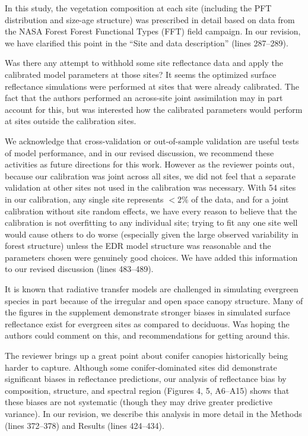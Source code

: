 In this study, the vegetation composition at each site (including the PFT distribution and size-age structure) was prescribed in detail based on data from the NASA Forest Forest Functional Types (FFT) field campaign.
In our revision, we have clarified this point in the ``Site and data description'' (lines 287--289).

\begin{reviewer}
  Was there any attempt to withhold some site reflectance data and apply the calibrated model parameters at those sites?
  It seems the optimized surface reflectance simulations were performed at sites that were already calibrated.
  The fact that the authors performed an across-site joint assimilation may in part account for this, but was interested how the calibrated parameters would perform at sites outside the calibration sites.
\end{reviewer}

We acknowledge that cross-validation or out-of-sample validation are useful tests of model performance, and in our revised discussion, we recommend these activities as future directions for this work.
However as the reviewer points out, because our calibration was joint across all sites, we did not feel that a separate validation at other sites not used in the calibration was necessary.
With 54 sites in our calibration, any single site represents $<2\%$ of the data, and for a joint calibration without site random effects, we have every reason to believe that the calibration is not overfitting to any individual site;
trying to fit any one site well would cause others to do worse (especially given the large observed variability in forest structure) unless the EDR model structure was reasonable and the parameters chosen were genuinely good choices.
We have added this information to our revised discussion (lines 483--489).

\begin{reviewer}
  It is known that radiative transfer models are challenged in simulating evergreen species in part because of the irregular and open space canopy structure.
  Many of the figures in the supplement demonstrate stronger biases in simulated surface reflectance exist for evergreen sites as compared to deciduous. Was hoping the authors could comment on this, and recommendations for getting around this.
\end{reviewer}

The reviewer brings up a great point about conifer canopies historically being harder to capture.
Although some conifer-dominated sites did demonstrate significant biases in reflectance predictions, our analysis of reflectance bias by composition, structure, and spectral region (Figures 4, 5, A6--A15) shows that these biases are not systematic (though they may drive greater predictive variance).
In our revision, we describe this analysis in more detail in the Methods (lines 372--378) and Results (lines 424--434).


